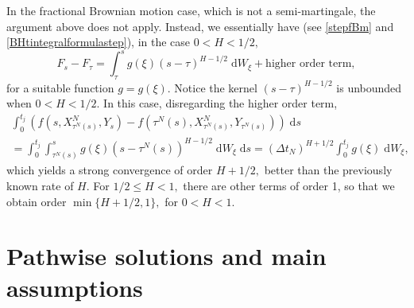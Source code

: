 \documentclass[reqno,12pt]{amsart}
\theoremstyle{plain} %
\theoremstyle{definition} %
\begin{document}
In the fractional Brownian motion case, which is not a semi-martingale, the argument above does not apply. Instead, we essentially have (see \cref{stepfBm} and \cref{BHtintegralformulastep}), in the case $0 < H < 1/2,$
\[
    F_s - F_\tau = \int_\tau^s g(\xi) (s-\tau)^{H-1/2}\;\mathrm{d}W_\xi + \text{higher order term},
\]
for a suitable function $g=g(\xi)$. Notice the kernel $(s-\tau)^{H-1/2}$ is unbounded when $0<H<1/2.$ In this case, disregarding the higher order term,
\begin{multline*}
    \int_0^{t_j} \left( f(s, X_{\tau^N(s)}^N, Y_s) - f(\tau^N(s), X_{\tau^N(s)}^N, Y_{\tau^N(s)}) \right)\;\mathrm{d}s \\ 
    = \int_0^{t_j} \int_{\tau^N(s)}^s g(\xi) (s-\tau^N(s))^{H-1/2} \;\mathrm{d} W_\xi\;\mathrm{d}s = (\Delta t_N)^{H+1/2} \int_0^{t_j} g(\xi)\;\mathrm{d} W_\xi,
\end{multline*}
which yields a strong convergence of order $H + 1/2,$ better than the previously known rate of $H.$ For $1/2 \leq H < 1,$ there are other terms of order 1, so that we obtain order $\min\{H+1/2, 1\},$ for $0 < H < 1.$

\section{Pathwise solutions and main assumptions}
\label{secpathwisesolution}
\end{document}

